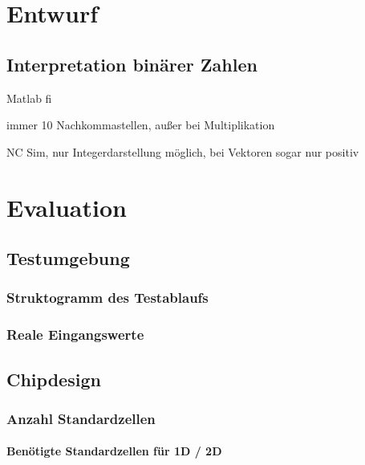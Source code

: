  
 
 
 
 

 
 
 
\chapter{Entwurf}

 
\section{Interpretation binärer Zahlen}
 Matlab fi
 
 immer 10 Nachkommastellen, außer bei Multiplikation
 
 NC Sim, nur Integerdarstellung möglich, bei Vektoren sogar nur positiv
 
 
 
 
  
 
 
 
 
  
 \chapter{Evaluation}
 


 \section{Testumgebung}
 \subsection{Struktogramm des Testablaufs}
 \subsection{Reale Eingangswerte}
 
 \section{Chipdesign}
 \subsection{Anzahl Standardzellen}
 \subsubsection{Benötigte Standardzellen für 1D / 2D}
